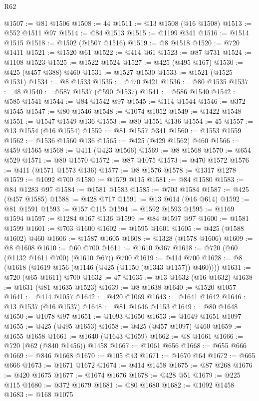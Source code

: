 \begin{lexlean}{R62}
\begin{coremodule}
@1507 := @81 @1506
@1508 := 44
@1511 := @13 @1508 (@16 @1508)
@1513 := @552 @1511 @97
@1514 := @84 @1513
@1515 := @1199 @341
@1516 := @1514 @1515
@1518 := @1502 (@1507 @1516)
@1519 := @8 @1518
@1520 := @720 @1411
@1521 := @1520 @61
@1522 := @414 @61
@1523 := @87 @731
@1524 := @1108 @1523
@1525 := @1522 @1524
@1527 := @425 (@495 @167)
@1530 := @425 (@457 @388) @460
@1531 := @1527 @1530
@1533 := @1521 (@1525 @1531)
@1534 := @8 @1533
@1535 := @470 @421
@1536 := @80 @1535
@1537 := 48
@1540 := @587 @1537 (@590 @1537)
@1541 := @586 @1540
@1542 := @585 @1541
@1544 := @84 @1542 @97
@1545 := @114 @1544
@1546 := @372 @1545
@1547 := @80 @1546
@1548 := @1074 @1052
@1549 := @1422 @1548
@1551 := @1547 @1549 @136
@1553 := @80 @1551 @136
@1554 := 45
@1557 := @13 @1554 (@16 @1554)
@1559 := @81 @1557 @341
@1560 := @1553 @1559
@1562 := @1536 @1560 @136
@1565 := @425 (@429 @1562) @460
@1566 := @459 @1565
@1568 := @411 (@423 @1566)
@1569 := @8 @1568
@1570 := @654 @529
@1571 := @80 @1570
@1572 := @87 @1075
@1573 := @470 @1572
@1576 := @411 (@1571 @1573 @136)
@1577 := @8 @1576
@1578 := @1317 @1278
@1579 := @1092 @700
@1580 := @1579 @115
@1581 := @84 @1580
@1583 := @84 @1283 @97
@1584 := @1581 @1583
@1585 := @703 @1584
@1587 := @425 (@457 @1585)
@1588 := @428 @717
@1591 := @13 @614 (@16 @614)
@1592 := @81 @1591
@1593 := @157 @115
@1594 := @1592 @1593
@1595 := @1169 @1594
@1597 := @1284 @167 @136
@1599 := @84 @1597 @97
@1600 := @1581 @1599
@1601 := @703 @1600
@1602 := @1595 @1601
@1605 := @425 (@1588 @1602) @460
@1606 := @1587 @1605
@1608 := @1328 (@1578 @1606)
@1609 := @8 @1608
@1610 := @60 @700
@1611 := @1610 @367
@1618 := @720 (@60 (@1132 @1611 @700) (@1610 @67)) @700
@1619 := @414 @700
@1628 := @8 (@1618 (@1619 @156 (@1146 (@425 (@1150 (@1343 @1157)) @460))))
@1631 := @720 (@65 @1611) @700
@1632 := 47
@1635 := @13 @1632 (@16 @1632)
@1638 := @1631 (@81 @1635 @1523)
@1639 := @8 @1638
@1640 := @1520 @1057
@1641 := @414 @1057
@1642 := @420 @1069
@1643 := @1641 @1642
@1646 := @13 @1537 (@16 @1537)
@1648 := @81 @1646 @1153
@1649 := @80 @1648
@1650 := @1078 @97
@1651 := @1093 @1650
@1653 := @1649 @1651 @1097
@1655 := @425 (@495 @1653)
@1658 := @425 (@457 @1097) @460
@1659 := @1655 @1658
@1661 := @1640 (@1643 @1659)
@1662 := @8 @1661
@1666 := @720 (@62 (@840 @1456)) @1458
@1667 := @1061 @656
@1668 := @655 @666
@1669 := @846 @1668
@1670 := @105 @43
@1671 := @1670 @64
@1672 := @665 @666
@1673 := @1671 @1672
@1674 := @414 @1458
@1675 := @87 @268
@1676 := @420 @1675
@1677 := @1674 @1676
@1678 := @428 @51
@1679 := @225 @115
@1680 := @372 @1679
@1681 := @80 @1680
@1682 := @1092 @1458
@1683 := @168 @1075

\end{coremodule}
\end{lexlean}
